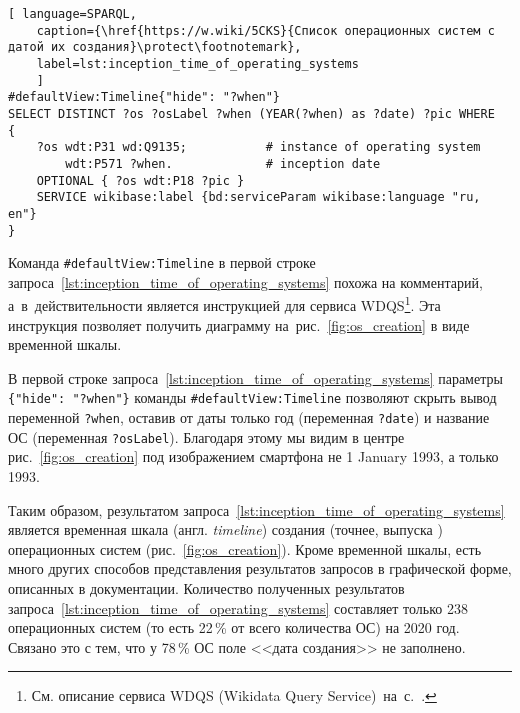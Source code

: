 \begin{lstlisting}[ language=SPARQL, 
	caption={\href{https://w.wiki/5CKS}{Список операционных систем с датой их создания}\protect\footnotemark},
	label=lst:inception_time_of_operating_systems
	]
#defaultView:Timeline{"hide": "?when"}
SELECT DISTINCT ?os ?osLabel ?when (YEAR(?when) as ?date) ?pic WHERE
{
    ?os wdt:P31 wd:Q9135;           # instance of operating system
        wdt:P571 ?when.             # inception date
    OPTIONAL { ?os wdt:P18 ?pic }
    SERVICE wikibase:label {bd:serviceParam wikibase:language "ru, en"}
}
\end{lstlisting}


\newpage
Команда \lstinline|#defaultView:Timeline| в первой строке 
запроса~\ref{lst:inception_time_of_operating_systems} 
похожа на комментарий, 
а~в~действительности является инструкцией для сервиса WDQS\footnote{%
    См. описание сервиса WDQS (Wikidata Query Service)~на~с.~\pageref{sect:WDQS}.%
}. 
Эта инструкция позволяет получить диаграмму на~рис.~\ref{fig:os_creation} 
в виде временной шкалы.

В первой строке запроса~\ref{lst:inception_time_of_operating_systems} 
параметры \lstinline|{"hide": "?when"}| 
команды \lstinline|#defaultView:Timeline| позволяют скрыть вывод переменной \lstinline|?when|, 
оставив от даты только год (переменная \lstinline|?date|) 
и название ОС (переменная \lstinline|?osLabel|). 
Благодаря этому мы видим в центре рис.~\ref{fig:os_creation} 
под изображением смартфона не 1 January 1993, а только 1993. 

Таким образом, результатом запроса~\ref{lst:inception_time_of_operating_systems} 
является временная шкала (англ. \textit{timeline}) создания (точнее, выпуска%
) %
операционных систем (рис.~\ref{fig:os_creation}). 
Кроме временной шкалы, есть много других способов представления результатов запросов 
в графической форме, описанных в документации\autocite{WQSResultViews}. 
Количество полученных результатов запроса~\ref{lst:inception_time_of_operating_systems} 
составляет только 238 операционных систем (то есть 22\,\% от всего количества ОС) на 2020 год. 
Связано это с тем, что у 78\,\% ОС поле <<дата создания>> не заполнено.

